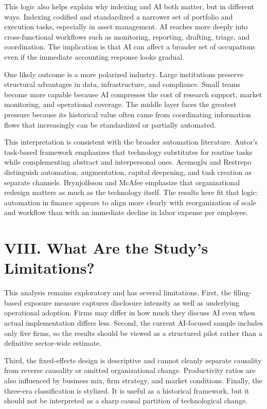 \documentclass[11pt]{article}
\begin{document}
This logic also helps explain why indexing and AI both matter, but in different ways. Indexing codified and standardized a narrower set of portfolio and execution tasks, especially in asset management. AI reaches more deeply into cross-functional workflows such as monitoring, reporting, drafting, triage, and coordination. The implication is that AI can affect a broader set of occupations even if the immediate accounting response looks gradual.

One likely outcome is a more polarized industry. Large institutions preserve structural advantages in data, infrastructure, and compliance. Small teams become more capable because AI compresses the cost of research support, market monitoring, and operational coverage. The middle layer faces the greatest pressure because its historical value often came from coordinating information flows that increasingly can be standardized or partially automated.

This interpretation is consistent with the broader automation literature. Autor's task-based framework emphasizes that technology substitutes for routine tasks while complementing abstract and interpersonal ones. Acemoglu and Restrepo distinguish automation, augmentation, capital deepening, and task creation as separate channels. Brynjolfsson and McAfee emphasize that organizational redesign matters as much as the technology itself. The results here fit that logic: automation in finance appears to align more clearly with reorganization of scale and workflow than with an immediate decline in labor expense per employee.

\section{VIII. What Are the Study's Limitations?}
This analysis remains exploratory and has several limitations. First, the filing-based exposure measure captures disclosure intensity as well as underlying operational adoption. Firms may differ in how much they discuss AI even when actual implementation differs less. Second, the current AI-focused sample includes only five firms, so the results should be viewed as a structured pilot rather than a definitive sector-wide estimate.

Third, the fixed-effects design is descriptive and cannot cleanly separate causality from reverse causality or omitted organizational change. Productivity ratios are also influenced by business mix, firm strategy, and market conditions. Finally, the three-era classification is stylized. It is useful as a historical framework, but it should not be interpreted as a sharp causal partition of technological change.
\end{document}
